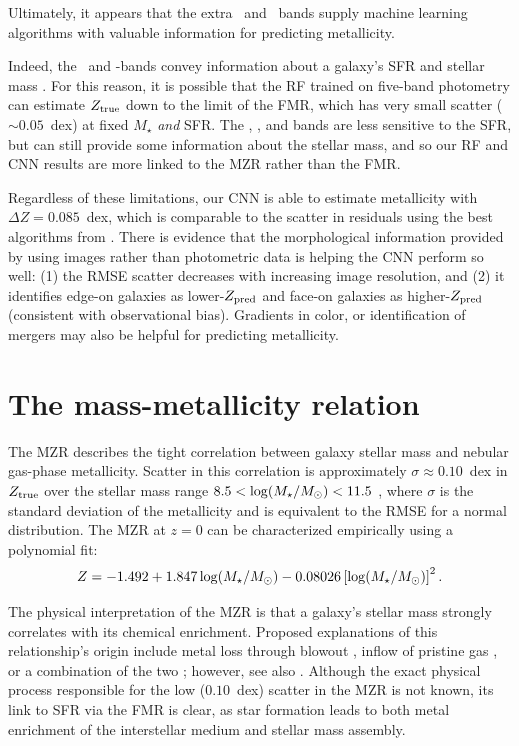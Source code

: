 \documentclass[fleqn,usenatbib]{mnras}
\begin{document}
Ultimately, it appears that the extra \sdssu\ and \sdssz\ bands supply machine learning algorithms with valuable information for predicting metallicity.

Indeed, the \sdssu\ and \sdssz-bands convey information about a galaxy's SFR and stellar mass \cite[see, e.g.,][]{Hopkins2003}. For this reason, it is possible that the RF trained on five-band photometry can estimate $Z_{\rm true}$ down to the limit of the FMR, which has very small scatter ($\sim 0.05$~dex) at fixed $M_{\star}$ \textit{and} SFR. The \sdssg{}, \sdssr{}, and \sdssi{} bands are less sensitive to the SFR, but can still provide some information about the stellar mass, and so our RF and CNN results are more linked to the MZR rather than the FMR.

Regardless of these limitations, our CNN is able to estimate metallicity with $\Delta Z = 0.085$~dex, which is comparable to the scatter in residuals using the best algorithms from \cite{Acquaviva2016}. There is evidence that the morphological information provided by using images rather than photometric data is helping the CNN perform so well: (1) the RMSE scatter decreases with increasing image resolution, and (2) it identifies edge-on galaxies as lower-$Z_{\rm pred}$ and face-on galaxies as higher-$Z_{\rm pred}$ (consistent with observational bias). Gradients in color, or identification of mergers  may also be helpful for predicting metallicity.


\section{The mass-metallicity relation} \label{sec:MZR}
The MZR describes the tight correlation between galaxy stellar mass and nebular gas-phase metallicity. Scatter in this correlation is approximately $\sigma \approx 0.10$~dex in $Z_{\rm true}$ over the stellar mass range $8.5 < \log (\hbox{$M_{\star}$} / \hbox{$M_\odot$}) < 11.5$ \citep{Tremonti2004}, where $\sigma$ is the standard deviation of the metallicity and is equivalent to the RMSE for a normal distribution. The MZR at $z=0$ can be characterized empirically using a polynomial fit:
\begin{equation}\label{eq:mzr}
Z = -1.492 + 1.847 \log (\hbox{$M_{\star}$} / \hbox{$M_\odot$}) - 0.08026 \left [\log(\hbox{$M_{\star}$} / \hbox{$M_\odot$})\right ]^2.
\end{equation}

The physical interpretation of the MZR is that a galaxy's stellar mass strongly correlates with its chemical enrichment. Proposed explanations of this relationship's origin include metal loss through blowout \citep[see, e.g.,][]{2002ApJ...581.1019G,Tremonti2004,Brooks2007,Dave2012}, inflow of pristine gas \cite{Dalcanton2004}, or a combination of the two ; however, see also \cite{2013A&A...554A..58S}. Although the exact physical process responsible for the low ($0.10$~dex) scatter in the MZR is not known, its link to SFR via the FMR is clear, as star formation leads to both metal enrichment of the interstellar medium and stellar mass assembly.
\end{document}
